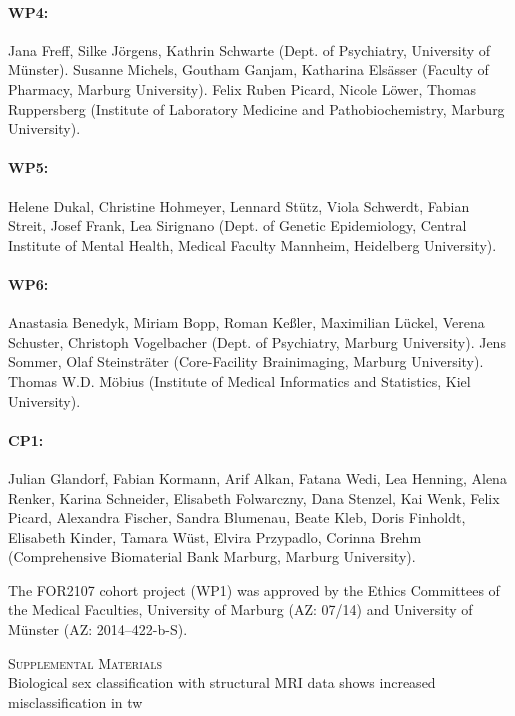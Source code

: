 \documentclass{article}
\begin{document}
    \paragraph{WP4:} Jana Freff, Silke Jörgens, Kathrin Schwarte (Dept. of Psychiatry, University of Münster). Susanne Michels, Goutham Ganjam, Katharina Elsässer (Faculty of Pharmacy, Marburg University). Felix Ruben Picard, Nicole Löwer, Thomas Ruppersberg (Institute of Laboratory Medicine and Pathobiochemistry, Marburg University).
    \paragraph{WP5:} Helene Dukal, Christine Hohmeyer, Lennard Stütz, Viola Schwerdt, Fabian Streit, Josef Frank, Lea Sirignano (Dept. of Genetic Epidemiology, Central Institute of Mental Health, Medical Faculty Mannheim, Heidelberg University).
    \paragraph{WP6:} Anastasia Benedyk, Miriam Bopp, Roman Keßler, Maximilian Lückel, Verena Schuster, Christoph Vogelbacher (Dept. of Psychiatry, Marburg University). Jens Sommer, Olaf Steinsträter (Core-Facility Brainimaging, Marburg University). Thomas W.D. Möbius (Institute of Medical Informatics and Statistics, Kiel University).
    \paragraph{CP1:} Julian Glandorf, Fabian Kormann, Arif Alkan, Fatana Wedi, Lea Henning, Alena Renker, Karina Schneider, Elisabeth Folwarczny, Dana Stenzel, Kai Wenk, Felix Picard, Alexandra Fischer, Sandra Blumenau, Beate Kleb, Doris Finholdt, Elisabeth Kinder, Tamara Wüst, Elvira Przypadlo, Corinna Brehm (Comprehensive Biomaterial Bank Marburg, Marburg University).

    The FOR2107 cohort project (WP1) was approved by the Ethics Committees of the Medical Faculties, University of Marburg (AZ: 07/14) and University of Münster (AZ: 2014--422-b-S).


    
    

    \newpage
    \appendix


    \begin{center}
        \LARGE{\textsc{Supplemental Materials}} \\ \Large{Biological sex classification with structural MRI data shows increased misclassification in \acl{tw}}
    \end{center}
\end{document}
